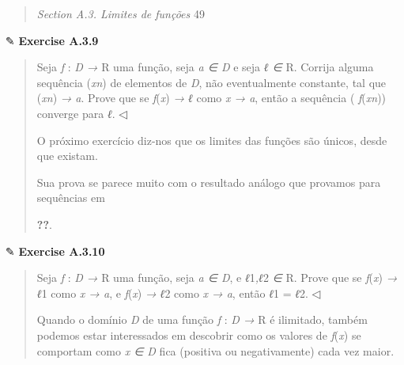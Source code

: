 \documentclass[
]{article}
\begin{document}
\begin{quote}
\emph{Section A.3. Limites de funções} 49
\end{quote}

✎ \textbf{Exercise A.3.9}

\begin{quote}
Seja \emph{f} : \emph{D →} R uma função, seja \emph{a ∈ D} e seja
\emph{ℓ ∈} R. Corrija alguma sequência (\emph{xn}) de elementos de
\emph{D}, não eventualmente constante, tal que (\emph{xn}) \emph{→ a}.
Prove que se \emph{f}(\emph{x}) \emph{→ ℓ} como \emph{x → a}, então a
sequência ( \emph{f}(\emph{xn})) converge para \emph{ℓ}. ◁

O próximo exercício diz-nos que os limites das funções são únicos, desde
que existam.

Sua prova se parece muito com o resultado análogo que provamos para
sequências em

\textbf{??}.
\end{quote}

✎ \textbf{Exercise A.3.10}

\begin{quote}
Seja \emph{f} : \emph{D →} R uma função, seja \emph{a ∈ D}, e
\emph{ℓ}1\emph{,ℓ}2 \emph{∈} R. Prove que se \emph{f}(\emph{x}) \emph{→
ℓ}1 como \emph{x → a}, e \emph{f}(\emph{x}) \emph{→ ℓ}2 como \emph{x →
a}, então \emph{ℓ}1 = \emph{ℓ}2. ◁

Quando o domínio \emph{D} de uma função \emph{f} : \emph{D →} R é
ilimitado, também podemos estar interessados em descobrir como os
valores de \emph{f}(\emph{x}) se comportam como \emph{x ∈ D} fica
(positiva ou negativamente) cada vez maior.
\end{quote}
\end{document}

